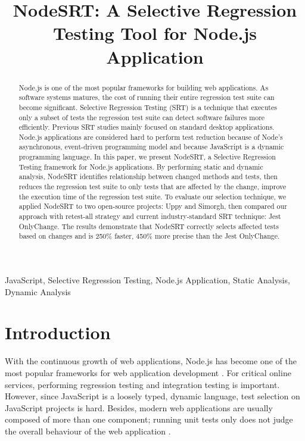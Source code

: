 \documentclass[10pt, conference]{IEEEtran}
\begin{document}
\title{NodeSRT: A Selective Regression Testing Tool for Node.js Application}

\author{
}

\maketitle

\begin{abstract}
Node.js is one of the most popular frameworks for building web applications. As software systems 
matures, the cost of running their entire regression test suite can become significant. 
Selective Regression Testing (SRT) is a technique that executes only a subset of tests the regression test suite can detect software failures more efficiently. 
Previous SRT studies mainly focused on standard desktop applications. Node.js applications are 
considered hard to perform test reduction because of Node's asynchronous, event-driven programming model and because  
JavaScript is a dynamic programming language. 
In this paper, we present NodeSRT, a Selective Regression Testing framework for Node.js applications. 
By performing static and dynamic analysis, NodeSRT identifies relationship between changed methods and tests, 
then reduces the regression test suite to only tests that are 
affected by the change, improve the execution time of the regression test suite. 
To evaluate our selection technique, we applied NodeSRT to two open-source projects: Uppy and Simorgh, 
then compared our approach with retest-all strategy and current industry-standard SRT technique: Jest 
OnlyChange. The results demonstrate that NodeSRT correctly selects affected tests based on 
changes and is 250\% faster, 450\% more precise than the Jest OnlyChange. 
    
\end{abstract}

\begin{IEEEkeywords}
JavaScript, Selective Regression Testing, Node.js Application, Static Analysis, Dynamic Analysis
\end{IEEEkeywords}

\section{Introduction}
With the continuous growth of web applications, Node.js has become one of the most popular frameworks 
for web application development \cite{b16}. For critical online services, performing regression testing and integration testing is important. However, 
since JavaScript is a loosely typed, dynamic language, test 
selection on JavaScript projects is hard. Besides, modern web applications are usually composed of 
more than one component; running unit tests only does not judge the overall behaviour of the web 
application \cite{b8}. 
\end{document}
